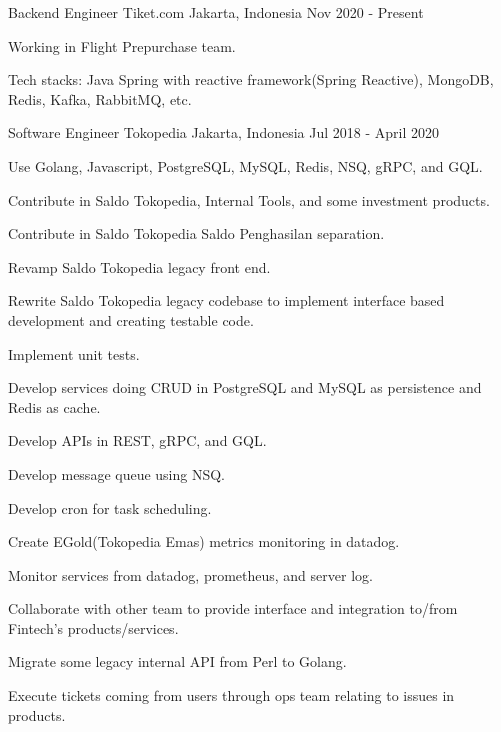 \begin{cventries}

\cventry
    {Backend Engineer}
    {Tiket.com}
    {Jakarta, Indonesia}
    {Nov 2020 - Present}
    {
        \begin{cvitems}
            \item {Working in Flight Prepurchase team.}
            \item {Tech stacks: Java Spring with reactive framework(Spring Reactive), MongoDB, Redis, Kafka, RabbitMQ, etc.}
        \end{cvitems}
    }

\cventry
    {Software Engineer}
    {Tokopedia}
    {Jakarta, Indonesia}
    {Jul 2018 - April 2020}
    {
        \begin{cvitems}
            \item {Use Golang, Javascript, PostgreSQL, MySQL, Redis, NSQ, gRPC, and GQL.}
            \item {Contribute in Saldo Tokopedia, Internal Tools, and some investment products.}
            \item {Contribute in Saldo Tokopedia Saldo Penghasilan separation.}
            \item {Revamp Saldo Tokopedia legacy front end.}
            \item {Rewrite Saldo Tokopedia legacy codebase to implement interface based development and creating testable code.}
            \item {Implement unit tests.}
            \item {Develop services doing CRUD in PostgreSQL and MySQL as persistence and Redis as cache.}
            \item {Develop APIs in REST, gRPC, and GQL.}
            \item {Develop message queue using NSQ.}
            \item {Develop cron for task scheduling.}
            \item {Create EGold(Tokopedia Emas) metrics monitoring in datadog.}
            \item {Monitor services from datadog, prometheus, and server log.}
            \item {Collaborate with other team to provide interface and integration to/from Fintech’s products/services.}
            \item {Migrate some legacy internal API from Perl to Golang.}
            \item {Execute tickets coming from users through ops team relating to issues in products.}
        \end{cvitems}
    }


\end{cventries}
